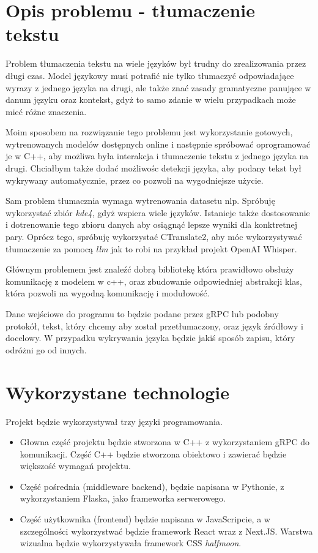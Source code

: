 \documentclass{article}
\begin{document}
\section{Opis problemu - tłumaczenie tekstu}

Problem tłumaczenia tekstu na wiele języków był trudny do zrealizowania przez długi czas. Model językowy musi potrafić nie tylko tłumaczyć odpowiadające wyrazy z jednego języka na drugi, ale także znać zasady gramatyczne panujące w danum języku oraz kontekst, gdyż to samo zdanie w wielu przypadkach może mieć różne znaczenia. 

Moim sposobem na rozwiązanie tego problemu jest wykorzystanie gotowych, wytrenowanych modelów dostępnych online i następnie spróbować oprogramować je w C++, aby możliwa była interakcja i tłumaczenie tekstu z jednego języka na drugi. Chciałbym także dodać możliwośc detekcji języka, aby podany tekst był wykrywany automatycznie, przez co pozwoli na wygodniejsze użycie. 

Sam problem tłumacznia wymaga wytrenowania datasetu nlp. Spróbuję wykorzystać zbiór \textit{kde4}, gdyż wspiera wiele języków. Istanieje także dostosowanie i dotrenowanie tego zbioru danych aby osiągnąć lepsze wyniki dla konktretnej pary. Oprócz tego, spróbuję wykorzystać CTranslate2, aby móc wykorzystywać tłumaczenie za pomocą \textit{llm} jak to robi na przykład projekt OpenAI Whisper.

Głównym problemem jest znaleźć dobrą bibliotekę która prawidłowo obsłuży komunikację z modelem w c++, oraz zbudowanie odpowiedniej abstrakcji klas, która pozwoli na wygodną komunikację i modułowość. 

Dane wejściowe do programu to będzie podane przez gRPC lub podobny protokół, tekst, który chcemy aby został przetłumaczony, oraz język źródłowy i docelowy. W przypadku wykrywania języka będzie jakiś sposób zapisu, który odróżni go od innych. 

\section{Wykorzystane technologie}

Projekt będzie wykorzystywał trzy języki programowania. 

\begin{itemize}
  \item Głowna część projektu będzie stworzona w C++ z wykorzystaniem gRPC do komunikacji. Część C++ będzie stworzona obiektowo i zawierać będzie większość wymagań projektu. 
  \item Część pośrednia (middleware backend), będzie napisana w Pythonie, z wykorzystaniem Flaska, jako frameworka serwerowego. 
  \item Część użytkownika (frontend) będzie napisana w JavaScripcie, a w szczególności wykorzystwać będzie framework React wraz z Next.JS. Warstwa wizualna będzie wykorzystywała framework CSS \textit{halfmoon}. 
\end{itemize}
\end{document}
